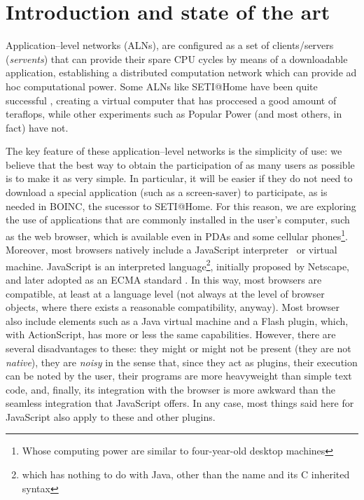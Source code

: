 \documentclass{llncs}
\begin{document}
\section{Introduction and state of the art}
\label{sec:intro}
Application--level networks (ALNs), are configured as a set of
clients/servers ({\em servents}) that
can provide their spare CPU cycles by means of a downloadable
application, establishing a distributed computation network which can
provide ad hoc computational power. Some ALNs
like SETI@Home have been quite successful \cite{david-seti:home},
creating a virtual computer that has proccesed a good amount of
teraflops, while other 
experiments such as Popular Power (and most others, in fact) have not\cite{DBLP:conf/p2p/2005lncs}. 

The key feature of these application--level networks is the simplicity
of use: we believe that the best way to obtain the participation of as
many users as possible is to make it as very simple. In particular, it
will be easier if they do not need to download a special application
(such as a screen-saver) to participate, as is needed in BOINC, the
sucessor to SETI@Home. For this reason, we are exploring the use of
applications that are commonly installed in the user's computer, such
as the web browser, which is available even in PDAs and some cellular
phones\footnote{Whose computing power are similar to four-year-old
desktop machines}.  Moreover, most browsers natively include a
JavaScript
interpreter~\cite{js:reference} or
virtual machine. JavaScript is an interpreted language\footnote{which
has nothing to do with Java, other than the name and its C inherited syntax},
initially proposed by Netscape, and later adopted as an
ECMA standard \cite{ECMA-262}.  In this
way, most browsers are compatible, at least at a language level (not
always at the level of browser objects, where there exists a
reasonable compatibility, anyway). Most browser also include elements
such as a Java virtual machine and a Flash plugin, which, with
ActionScript, has more or less the same capabilities. However, there
are several disadvantages to these: they might or might not be present
(they are not {\em native}), they are {\em noisy} in the sense that,
since they act as plugins, their execution can be noted by the
user, their programs are more heavyweight than simple text code, and,
finally, its integration with the browser is more awkward than the
seamless integration that JavaScript offers. In any case, most things
said here for JavaScript also apply to these and other plugins.
\end{document}

